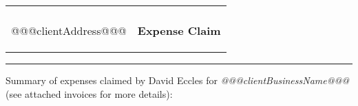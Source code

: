 \documentclass[10pt,a4paper,twoside]{letter}
\begin{document}

\hspace{\fill}

\begin{tabular}{lr}
  \begin{minipage}[c]{0.55\textwidth}
    @@@clientName@@@\\%
    @@@clientAddress@@@
  \end{minipage} &
  \begin{minipage}[c]{0.4\textwidth}
    \begin{center}
      \begin{framed}
        \huge{\textbf{Expense Claim}}
      \end{framed}
    \end{center}
  \end{minipage}%
\end{tabular}

\rule{\linewidth}{1pt}

\leftskip=10pt

Summary of expenses claimed by David Eccles for \emph{@@@clientBusinessName@@@}
(see attached invoices for more details):
\end{document}
